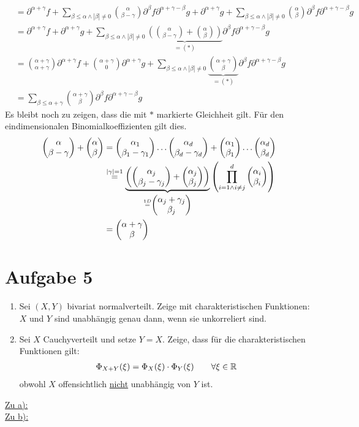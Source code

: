 \documentclass[12pt,a4paper]{article}
\begin{document}
\begin{lösung}
\begin{align*}
	&= \partial^{\alpha +\gamma}f + \displaystyle \sum_{\beta \leq \alpha \land |\beta|\neq 0} \binom{\alpha }{\beta - \gamma} \partial^{\beta} f \partial^{\alpha +\gamma -\beta}g + \partial^{\alpha +\gamma}g + \displaystyle \sum_{\beta \leq \alpha \land |\beta|\neq 0 } \binom{\alpha }{\beta}  \partial^{\beta} f \partial^{\alpha +\gamma -\beta}g\\
	&= \partial^{\alpha +\gamma}f + \partial^{\alpha +\gamma}g + \displaystyle \sum_{\beta \leq \alpha \land |\beta|\neq 0} \underbrace{\left( \binom{\alpha }{\beta - \gamma} + \binom{\alpha }{\beta} \right)}_{=(*)} \partial^{\beta} f \partial^{\alpha +\gamma -\beta}g\\
	&= \binom{\alpha +\gamma}{\alpha +\gamma}\partial^{\alpha +\gamma}f + \binom{\alpha +\gamma}{0}\partial^{\alpha +\gamma}g + \displaystyle \sum_{\beta \leq \alpha \land |\beta|\neq 0}  \underbrace{\binom{\alpha + \gamma}{\beta}}_{=(*)} \partial^{\beta} f \partial^{\alpha +\gamma -\beta}g\\
	&=\displaystyle \sum_{\beta \leq \alpha + \gamma} \binom{\alpha + \gamma}{\beta}\partial^\beta f \partial^{\alpha+\gamma -\beta}g
\end{align*}
Es bleibt noch zu zeigen, dass die mit $*$ markierte Gleichheit gilt. Für den eindimensionalen Binomialkoeffizienten gilt dies.
\begin{align*}
	\begin{pmatrix} {\alpha }\\{\beta - \gamma} \end{pmatrix} + \begin{pmatrix} {\alpha }\\{\beta} \end{pmatrix} &=  \begin{pmatrix} {\alpha_1 }\\{\beta_1 - \gamma_1} \end{pmatrix}\dots \begin{pmatrix} {\alpha_d }\\{\beta_d - \gamma_d} \end{pmatrix} + \begin{pmatrix} {\alpha_1 }\\{\beta_1} \end{pmatrix}\dots \begin{pmatrix} {\alpha_d }\\{\beta_d} \end{pmatrix}\\
	&\stackrel{|\gamma|=1}{=} \underbrace{\left( \begin{pmatrix} {\alpha_j}\\{\beta_j -\gamma_j} \end{pmatrix} + \begin{pmatrix} {\alpha_j}\\{\beta_j} \end{pmatrix} \right)}_{\stackrel{1D}{=}\begin{pmatrix} {\alpha_j + \gamma_j}\\{\beta_j} \end{pmatrix}} \left( \prod \limits^d_{i=1 \land i\neq j} \begin{pmatrix} {\alpha_i}\\{\beta_i} \end{pmatrix} \right)\\
	&= \begin{pmatrix} {\alpha +\gamma }\\{\beta} \end{pmatrix}
\end{align*}
\end{lösung}

\section*{Aufgabe 5}
\begin{enumerate}[label=\alph*)]
\item Sei $(X,Y)$ bivariat normalverteilt. Zeige mit charakteristischen Funktionen: $X$ und $Y$ sind unabhängig genau dann, wenn sie unkorreliert sind.
\item Sei $X$ Cauchyverteilt und setze $Y=X$. Zeige, dass für die charakteristischen Funktionen gilt:
\begin{align*}
\Phi_{X+Y}(\xi)=\Phi_X(\xi)\cdot\Phi_Y(\xi)\qquad\forall\xi\in\mathbb{R}
\end{align*} 
obwohl $X$ offensichtlich \ul{nicht} unabhängig von $Y$ ist.
\end{enumerate}

\begin{lösung}
\underline{Zu a):}\\
\underline{Zu b):}\\
\end{lösung}
\end{document}
